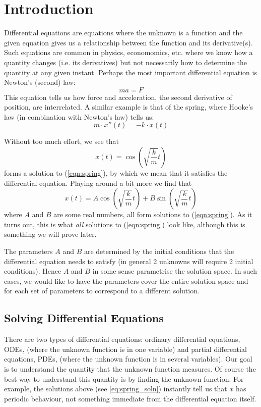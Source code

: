 \section{Introduction}
Differential equations are equations where the unknown is a function and the given equation gives us a relationship between the function and its derivative(s). Such equations are common in physics, economomics, etc. where we know how a quantity changes (i.e. its derivatives) but not necessarily how to determine the quantity at any given instant. Perhaps the most important differential equation is Newton's (second) law:
$$ ma = F $$
This equation tells us how force and acceleration, the second derivative of position, are interrelated. A similar example is that of the spring, where Hooke's law (in combination with Newton's law) tells us:
\begin{equation}\label{eqn:spring}
    m \cdot x''(t) = -k \cdot x(t)
\end{equation}

Without too much effort, we see that
$$ x(t) = \cos\left(\sqrt{\frac{k}{m}}t\right) $$
forms a solution to (\ref*{eqn:spring}), by which we mean that it satisfies the differential equation. Playing around a bit more we find that
\begin{equation}\label{eq:spring_soln}
    x(t) = A\cos\left(\sqrt{\frac{k}{m}}t\right) + B\sin\left(\sqrt{\frac{k}{m}}t\right)
\end{equation}
where $A$ and $B$ are some real numbers, all form solutions to (\ref*{eqn:spring}). As it turns out, this is what \textit{all} solutions to (\ref*{eqn:spring}) look like, although this is something we will prove later.

The parameters $A$ and $B$ are determined by the initial conditions that the differential equation needs to satisfy (in general 2 unknowns will require 2 initial conditions). Hence $A$ and $B$ in some sense parametrise the solution space. In such cases, we would like to have the parameters cover the entire solution space and for each set of parameters to correspond to a different solution.

\subsection{Solving Differential Equations}
There are two types of differential equations: ordinary differential equations, ODEs, (where the unknown function is in one variable) and partial differential equations, PDEs, (where the unknown function is in several variables). Our goal is to understand the quantity that the unknown function measures. Of course the best way to understand this quantity is by finding the unknown function. For example, the solutions above (see \autoref{eq:spring_soln}) instantly tell us that $x$ has periodic behaviour, not something immediate from the differential equation itself.

